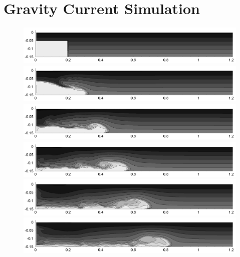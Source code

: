 \normalsize
\section{Gravity Current Simulation}
\label{chapter:GravityCurrentTest}


 \cp
 \cp
 \cp



\begin{figure}[htbp]
  \begin{center}    \includegraphics[scale=0.55]{../figures/Staggered/Fig9case/060518c-SSPRK35-dt-00375-140-60/01.png}    \includegraphics[scale=0.55]{../figures/Staggered/Fig9case/060518c-SSPRK35-dt-00375-140-60/02.png}
\includegraphics[scale=0.55]{../figures/Staggered/Fig9case/060518c-SSPRK35-dt-00375-140-60/03.png}
\includegraphics[scale=0.55]{../figures/Staggered/Fig9case/060518c-SSPRK35-dt-00375-140-60/04.png}    \includegraphics[scale=0.55]{../figures/Staggered/Fig9case/060518c-SSPRK35-dt-00375-140-60/05.png}
\includegraphics[scale=0.55]{../figures/Staggered/Fig9case/060518c-SSPRK35-dt-00375-140-60/06.png}

\end{center}
\end{figure}
